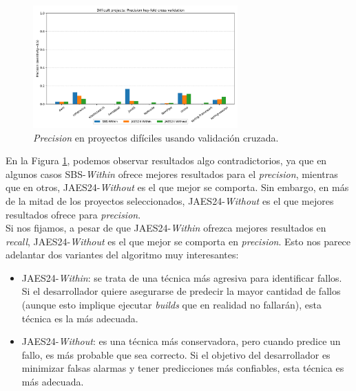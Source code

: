 \begin{figure}[H]
    \centering
    \includegraphics[width=0.7\textwidth]{images/Difficult projects: Precision key-fold cross validation.pdf}
    \caption{\textit{Precision} en proyectos difíciles usando validación cruzada.}
    \label{fig:key-fold_precision_difficult_projects}
\end{figure}

En la Figura \ref{fig:key-fold_precision_difficult_projects}, podemos observar resultados algo
contradictorios, ya que en algunos casos SBS-\textit{Within} ofrece mejores resultados para
el \textit{precision}, mientras que en otros, JAES24-\textit{Without} es el que mejor se comporta.
Sin embargo, en más de la mitad de los proyectos seleccionados, JAES24-\textit{Without} es el que
mejores resultados ofrece para \textit{precision}.\\

Si nos fijamos, a pesar de que JAES24-\textit{Within} ofrezca mejores resultados en \textit{recall},
JAES24-\textit{Without} es el que mejor se comporta en \textit{precision}. Esto nos parece
adelantar dos variantes del algoritmo muy interesantes:

\begin{itemize}
    \item JAES24-\textit{Within}: se trata de una técnica más agresiva para identificar fallos. Si
    el desarrollador quiere asegurarse de predecir la mayor cantidad de fallos (aunque esto
    implique ejecutar \textit{builds} que en realidad no fallarán), esta técnica es la más
    adecuada.\\

    \item JAES24-\textit{Without}: es una técnica más conservadora, pero cuando predice un fallo,
    es más probable que sea correcto. Si el objetivo del desarrollador es minimizar falsas
    alarmas y tener predicciones más confiables, esta técnica es más adecuada.
\end{itemize}

